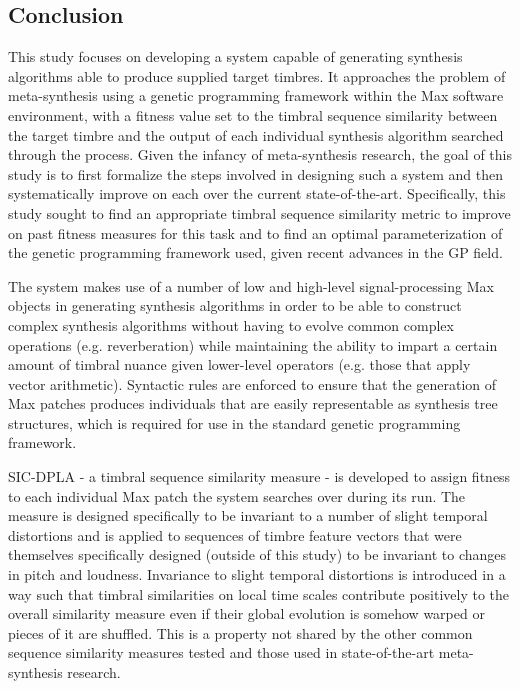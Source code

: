 \documentclass[a4paper,12pt]{report} 	%
\numberwithin{figure}{chapter}
\numberwithin{table}{chapter}
\numberwithin{equation}{chapter}
\begin{document}
\begin{flushleft}
\vspace*{\QuarterPage}
\chapter{Conclusion} %
This study focuses on developing a system capable of generating synthesis algorithms able to produce supplied target timbres. It approaches the problem of meta-synthesis using a genetic programming framework within the Max software environment, with a fitness value set to the timbral sequence similarity between the target timbre and the output of each individual synthesis algorithm searched through the process. Given the infancy of meta-synthesis research, the goal of this study is to first formalize the steps involved in designing such a system and then systematically improve on each over the current state-of-the-art. Specifically, this study sought to find an appropriate timbral sequence similarity metric to improve on past fitness measures for this task and to find an optimal parameterization of the genetic programming framework used, given recent advances in the GP field.

The system makes use of a number of low and high-level signal-processing Max objects in generating synthesis algorithms in order to be able to construct complex synthesis algorithms without having to evolve common complex operations (e.g. reverberation) while maintaining the ability to impart a certain amount of timbral nuance given lower-level operators (e.g. those that apply vector arithmetic). Syntactic rules are enforced to ensure that the generation of Max patches produces individuals that are easily representable as synthesis tree structures, which is required for use in the standard genetic programming framework.

SIC-DPLA - a timbral sequence similarity measure - is developed to assign fitness to each individual Max patch the system searches over during its run. The measure is designed specifically to be invariant to a number of slight temporal distortions and is applied to sequences of timbre feature vectors that were themselves specifically designed (outside of this study) to be invariant to changes in pitch and loudness. Invariance to slight temporal distortions is introduced in a way such that timbral similarities on local time scales contribute positively to the overall similarity measure even if their global evolution is somehow warped or pieces of it are shuffled. This is a property not shared by the other common sequence similarity measures tested and those used in state-of-the-art meta-synthesis research.


\end{flushleft}
\end{document}
